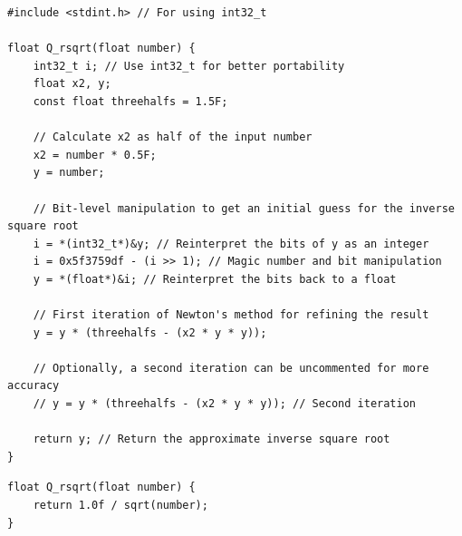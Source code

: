 \documentclass[sigplan,review,anonymous,10pt]{acmart}
\def\gptmodel{{GPT-4o}\xspace}
\newcommand{\sys}{{\scshape Kv{\textalpha}sir}\xspace}
\begin{document}
\begin{listing}[p]
\begin{verbatim}
#include <stdint.h> // For using int32_t

float Q_rsqrt(float number) {
    int32_t i; // Use int32_t for better portability
    float x2, y;
    const float threehalfs = 1.5F;

    // Calculate x2 as half of the input number
    x2 = number * 0.5F;
    y = number;

    // Bit-level manipulation to get an initial guess for the inverse square root
    i = *(int32_t*)&y; // Reinterpret the bits of y as an integer
    i = 0x5f3759df - (i >> 1); // Magic number and bit manipulation
    y = *(float*)&i; // Reinterpret the bits back to a float

    // First iteration of Newton's method for refining the result
    y = y * (threehalfs - (x2 * y * y));

    // Optionally, a second iteration can be uncommented for more accuracy
    // y = y * (threehalfs - (x2 * y * y)); // Second iteration

    return y; // Return the approximate inverse square root
}
\end{verbatim}
  \caption{The output of naively regenerating the fast inverse square root function using \gptmodel.
  Notice that the output is ostensibly idiomatic, as it still contains 
  magic numbers and bit-level manipulation.}
  \label{lst:fast_inv_sqrt_gpt}
\end{listing}

\begin{listing}[p]
\begin{verbatim}
float Q_rsqrt(float number) {
    return 1.0f / sqrt(number);
}
\end{verbatim}
\caption{The output of \sys for the fast inverse square root regeneration.}
  \label{lst:fast_inv_sqrt_sys}
\end{listing}

\end{document}

